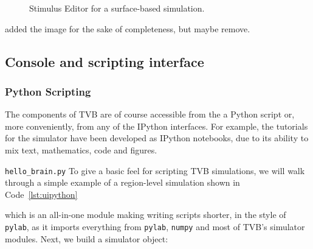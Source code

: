 	\begin{figure}[!htbp]
		\centering
		\caption{Stimulus Editor for a surface-based simulation.}
				\label{fig:stimulus}
	\end{figure}

	\note[psl] added the image for the sake of completeness, but maybe remove.  

\subsection{Console and scripting interface}


\subsubsection{Python Scripting}

The components of TVB are of course accessible from the a Python
script or, more conveniently, from any of the IPython interfaces.
For example, the tutorials for the simulator have been developed
as IPython notebooks, due to its ability to mix text, mathematics,
code and figures. 

\texttt{hello\_brain.py}
To give a basic feel for scripting TVB simulations, we will 
walk through a simple example of a region-level simulation shown in
Code~\ref{lst:uipython}




\noindent which is an all-in-one module making writing scripts
shorter, in the style of \texttt{pylab}, as it imports everything
from \texttt{pylab}, \texttt{numpy} and most of TVB's simulator
modules. Next, we build a simulator object:

